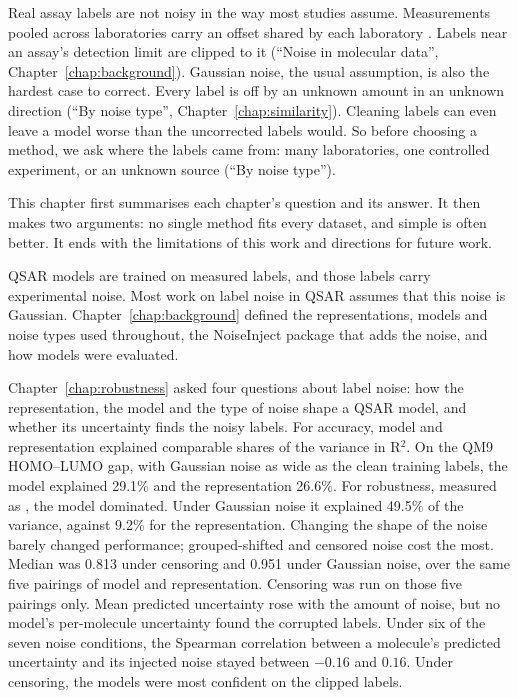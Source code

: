 Real assay labels are not noisy in the way most studies assume. Measurements pooled across laboratories carry an offset shared by each laboratory \citep{Bentz2013}. Labels near an assay's detection limit are clipped to it \citep{Svensson2025} (``Noise in molecular data'', Chapter~\ref{chap:background}). Gaussian noise, the usual assumption, is also the hardest case to correct. Every label is off by an unknown amount in an unknown direction (``By noise type'', Chapter~\ref{chap:similarity}). Cleaning labels can even leave a model worse than the uncorrected labels would. So before choosing a method, we ask where the labels came from: many laboratories, one controlled experiment, or an unknown source (``By noise type'').

This chapter first summarises each chapter's question and its answer. It then makes two arguments: no single method fits every dataset, and simple is often better. It ends with the limitations of this work and directions for future work.

QSAR models are trained on measured labels, and those labels carry experimental noise. Most work on label noise in QSAR assumes that this noise is Gaussian. Chapter~\ref{chap:background} defined the representations, models and noise types used throughout, the NoiseInject package that adds the noise, and how models were evaluated.

Chapter~\ref{chap:robustness} asked four questions about label noise: how the representation, the model and the type of noise shape a QSAR model, and whether its uncertainty finds the noisy labels. For accuracy, model and representation explained comparable shares of the variance in R$^2$. On the QM9 HOMO--LUMO gap, with Gaussian noise as wide as the clean training labels, the model explained 29.1\% and the representation 26.6\%. For robustness, measured as \aucnorm, the model dominated. Under Gaussian noise it explained 49.5\% of the variance, against 9.2\% for the representation. Changing the shape of the noise barely changed performance; grouped-shifted and censored noise cost the most. Median \aucnorm{} was 0.813 under censoring and 0.951 under Gaussian noise, over the same five pairings of model and representation. Censoring was run on those five pairings only. Mean predicted uncertainty rose with the amount of noise, but no model's per-molecule uncertainty found the corrupted labels. Under six of the seven noise conditions, the Spearman correlation between a molecule's predicted uncertainty and its injected noise stayed between $-0.16$ and $0.16$. Under censoring, the models were most confident on the clipped labels.


